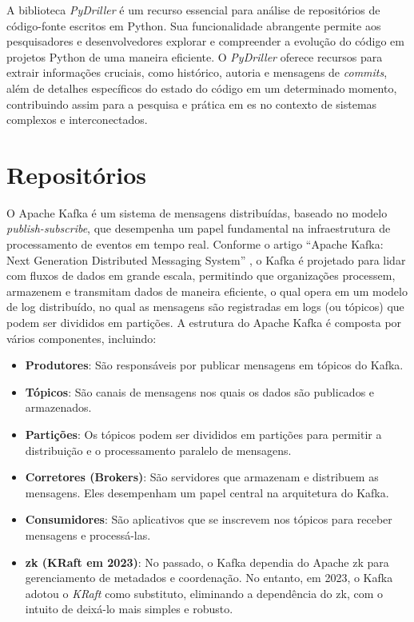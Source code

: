 A biblioteca \textit{PyDriller} \cite{PyDrillerSpadini2018} é um recurso essencial para análise de repositórios de código-fonte escritos em Python. Sua funcionalidade abrangente permite aos pesquisadores e desenvolvedores explorar e compreender a evolução do código em projetos Python de uma maneira eficiente. O \textit{PyDriller} oferece recursos para extrair informações cruciais, como histórico, autoria e mensagens de \textit{commits}, além de detalhes específicos do estado do código em um determinado momento, contribuindo assim para a pesquisa e prática em \gls{es} no contexto de sistemas complexos e interconectados.

\section{Repositórios}\label{sec:repositorios}

O Apache Kafka \cite{KafkaGitHub} é um sistema de mensagens distribuídas, baseado no modelo \textit{publish-subscribe}, que desempenha um papel fundamental na infraestrutura de processamento de eventos em tempo real. Conforme o artigo ``Apache Kafka: Next Generation Distributed Messaging System'' \cite{ApacheKafkaNextGenerationDistributedMessagingSystem:2010}, o Kafka é projetado para lidar com fluxos de dados em grande escala, permitindo que organizações processem, armazenem e transmitam dados de maneira eficiente, o qual opera em um modelo de log distribuído, no qual as mensagens são registradas em logs (ou tópicos) que podem ser divididos em partições. 
A estrutura do Apache Kafka é composta por vários componentes, incluindo:

\begin{itemize}
  \item \textbf{Produtores}: São responsáveis por publicar mensagens em tópicos do Kafka.
  \item \textbf{Tópicos}: São canais de mensagens nos quais os dados são publicados e armazenados.
  \item \textbf{Partições}: Os tópicos podem ser divididos em partições para permitir a distribuição e o processamento paralelo de mensagens.
  \item \textbf{Corretores (Brokers)}: São servidores que armazenam e distribuem as mensagens. Eles desempenham um papel central na arquitetura do Kafka.
  \item \textbf{Consumidores}: São aplicativos que se inscrevem nos tópicos para receber mensagens e processá-las.
  \item \textbf{\gls{zk} (KRaft em 2023)}: No passado, o Kafka dependia do Apache \gls{zk} para gerenciamento de metadados e coordenação. No entanto, em 2023, o Kafka adotou o \textit{KRaft} como substituto, eliminando a dependência do \gls{zk}, com o intuito de deixá-lo mais simples e robusto.
\end{itemize}

